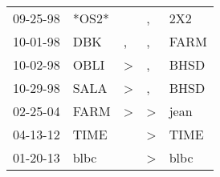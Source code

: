 \begin{supertabular}{p{0.07\textwidth}p{0.06\textwidth}p{0.02\textwidth}p{0.02\textwidth}p{0.06\textwidth}}
 09-25-98\textsuperscript{} &                   *OS2* &               &             , &   2X2\textsuperscript{} \\
 10-01-98\textsuperscript{} &   DBK\textsuperscript{} &             , &             , &  FARM\textsuperscript{} \\
 10-02-98\textsuperscript{} &  OBLI\textsuperscript{} &  \textgreater &             , &  BHSD\textsuperscript{} \\
 10-29-98\textsuperscript{} &  SALA\textsuperscript{} &  \textgreater &             , &  BHSD\textsuperscript{} \\
 02-25-04\textsuperscript{} &  FARM\textsuperscript{} &  \textgreater &  \textgreater &  jean\textsuperscript{} \\
 04-13-12\textsuperscript{} &  TIME\textsuperscript{} &               &  \textgreater &  TIME\textsuperscript{} \\
 01-20-13\textsuperscript{} &  blbc\textsuperscript{} &               &  \textgreater &  blbc\textsuperscript{} \\
\end{supertabular}
